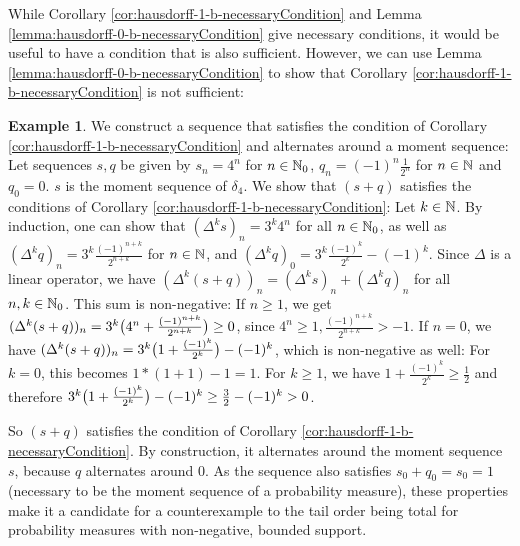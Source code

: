 \documentclass[a4paper,DIV=11,abstracton,twoside=semi]{scrreprt}
\theoremstyle{definition}
\newtheorem{ex}[thm]{Example} %
\begin{document}
    While Corollary \ref{cor:hausdorff-1-b-necessaryCondition} and Lemma \ref{lemma:hausdorff-0-b-necessaryCondition} give necessary conditions, it would be useful to have a condition that is also sufficient. However, we can use Lemma \ref{lemma:hausdorff-0-b-necessaryCondition} to show that Corollary \ref{cor:hausdorff-1-b-necessaryCondition} is not sufficient:
    
    \begin{ex}
        We construct a sequence that satisfies the condition of Corollary \ref{cor:hausdorff-1-b-necessaryCondition} and alternates around a moment sequence:
        Let sequences $s, q$ be given by $s_n = 4^n$ for $n \in \mathbb{N}_0$, $q_n = (-1)^n\frac{1}{2^n}$ for $n \in \mathbb{N}$ and $q_0 = 0$. $s$ is the moment sequence of $\delta_4$. We show that $(s + q)$ satisfies the conditions of Corollary \ref{cor:hausdorff-1-b-necessaryCondition}:
        Let $k \in \mathbb{N}$.
        By induction, one can show that $(\Delta^k s)_n = 3^k 4^n$ for all $n \in \mathbb{N}_0$, as well as $(\Delta^k q)_n = 3^k\frac{(-1)^{n+k}}{2^{n+k}}$ for $n \in \mathbb{N}$, and $(\Delta^k q)_0 = 3^k \frac{(-1)^k}{2^k} - (-1)^k$.
        Since $\Delta$ is a linear operator, we have ${(\Delta^k (s+q))_n} = {(\Delta^k s)_n + (\Delta^k q)_n}$ for all $n, k \in \mathbb{N}_0$. This sum is non-negative:
        If $n \geq 1$, we get $(\Delta^k (s+q))_n = 3^k\bigl(4^n + \frac{(-1)^{n+k}}{2^{n+k}}\bigr) \geq 0$, since $4^n \geq 1, \frac{(-1)^{n+k}}{2^{n+k}} > -1$.
        If $n = 0$, we have ${(\Delta^k (s+q))_n} = {3^k\bigl(1 + \frac{(-1)^{k}}{2^{k}}\bigr) - (-1)^k}$, which is non-negative as well:
        For $k = 0$, this becomes ${1*(1 + 1) - 1 = 1}$.
        For $k \geq 1$, we have $1 + \frac{(-1)^{k}}{2^{k}} \geq \frac{1}{2}$ and therefore $3^k\bigl(1 + \frac{(-1)^{k}}{2^{k}}\bigr) - (-1)^k \geq \frac{3}{2} - (-1)^k > 0$.
        
        
        So $(s+q)$ satisfies the condition of Corollary \ref{cor:hausdorff-1-b-necessaryCondition}. 
        By construction, it alternates around the moment sequence $s$, because $q$ alternates around 0.
        As the sequence also satisfies $s_0 + q_0 = s_0 = 1$ (necessary to be the moment sequence of a probability measure), these properties make it a candidate for a counterexample to the tail order being total for probability measures with non-negative, bounded support. 
        

\end{ex}
\end{document}
